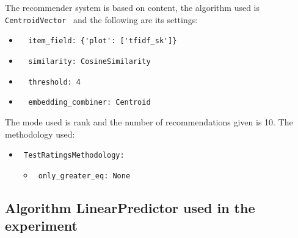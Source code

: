\documentclass[11pt]{article}
\begin{document}
The recommender system is based on content, the algorithm used
is \verb| CentroidVector | and the following are its settings:
\begin{itemize}
\item \begin{verbatim}
  item_field: {'plot': ['tfidf_sk']}
\end{verbatim}
\item \begin{verbatim}
  similarity: CosineSimilarity
\end{verbatim}
\item \begin{verbatim}
  threshold: 4
\end{verbatim}
\item \begin{verbatim}
  embedding_combiner: Centroid
\end{verbatim}
\end{itemize}
\hfill\break
The mode used is rank and the number of recommendations given
is 10.
The methodology used:
\begin{itemize}
    \item \verb| TestRatingsMethodology:|
    \begin{itemize}
                    \item \verb| only_greater_eq: None |
            \end{itemize}
\end{itemize}
\hfill\break






\subsection{Algorithm LinearPredictor used in the experiment}\label{subsec:algo_LinearPredictor}
\end{document}
